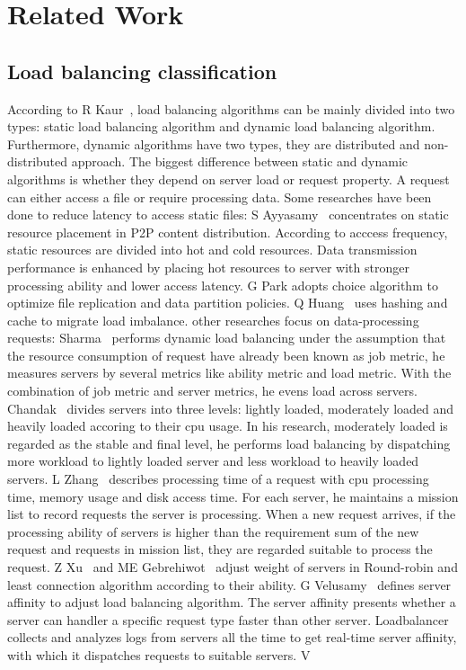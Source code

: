 \section{Related Work}
\label{sec:related_work}

\subsection{Load balancing classification}

\hspace{0pt}
According to R Kaur~{\cite{Kaur2014Load}}, load balancing algorithms can be mainly divided into two types: static load balancing algorithm and dynamic load balancing algorithm. Furthermore, dynamic algorithms have two types, they are distributed and non-distributed approach. The biggest difference between static and dynamic algorithms is whether they depend on server load or request property. A request can either access a file or require processing data. Some researches have been done to reduce latency to access static files: S Ayyasamy~{\cite{Ayyasamy2010A}} concentrates on static resource placement in P2P content distribution. According to acccess frequency, static resources are divided into hot and cold resources. Data transmission performance is enhanced by placing hot resources to server with stronger processing ability and lower access latency. G Park adopts choice algorithm to optimize file replication and data partition policies. Q Huang~{\cite{Huang2014Characterizing}} uses hashing and cache to migrate load imbalance. other researches focus on data-processing requests: Sharma~{\cite{Sharma2011Framework}} performs dynamic load balancing under the assumption that the resource consumption of request have already been known as job metric, he measures servers by several metrics like ability metric and load metric. With the combination of job metric and server metrics, he evens load across servers. Chandak~{\cite{Chandak2012Dynamic}} divides servers into three levels: lightly loaded, moderately loaded and heavily loaded accoring to their cpu usage. In his research, moderately loaded is regarded as the stable and final level, he performs load balancing by dispatching more workload to lightly loaded server and less workload to heavily loaded servers. L Zhang~{\cite{Zhang2010A}} describes processing time of a request with cpu processing time, memory usage and disk access time. For each server, he maintains a mission list to record requests the server is processing. When a new request arrives, if the processing ability of servers is higher than the requirement sum of the new request and requests in mission list, they are regarded suitable to process the request. Z Xu~{\cite{Xu2014A}} and ME Gebrehiwot~{\cite{Gebrehiwot2017Energy}} adjust weight of servers in Round-robin and least connection algorithm according to their ability. G Velusamy~{\cite{Velusamy2017Smart}} defines server affinity to adjust load balancing algorithm. The server affinity presents whether a server can handler a specific request type faster than other server. Loadbalancer collects and analyzes logs from servers all the time to get real-time server affinity, with which it dispatches requests to suitable servers. V 